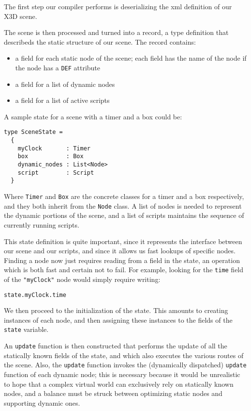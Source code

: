 
The first step our compiler performs is deserializing the xml definition of our X3D scene.

The scene is then processed and turned into a record, a type definition that describeds the static structure of our scene. The record contains:

\begin{itemize}
\item a field for each static node of the scene; each field has the name of the node if the node has a \texttt{DEF} attribute
\item a field for a list of dynamic nodes
\item a field for a list of active scripts
\end{itemize}

A sample state for a scene with a timer and a box could be:

\begin{lstlisting}
type SceneState =
  {
    myClock       : Timer 
    box           : Box
    dynamic_nodes : List<Node>
    script        : Script
  }
\end{lstlisting}

Where \texttt{Timer} and \texttt{Box} are the concrete classes for a timer and a box respectively, and they both inherit from the \texttt{Node} class.
A list of nodes is needed to represent the dynamic portions of the scene, and a list of scripts maintains the sequence of currently running scripts.

This state definition is quite important, since it represents the interface between our scene and our scripts, and since it allows us fast lookups of specific nodes. Finding a node now just requires reading from a field in the state, an operation which is both fast and certain not to fail. For example, looking for the \texttt{time} field of the \texttt{"myClock"} node would simply require writing:

\begin{lstlisting}
state.myClock.time
\end{lstlisting}

We then proceed to the initialization of the state. This amounts to creating instances of each node, and then assigning these instances to the fields of the \texttt{state} variable.

An \texttt{update} function is then constructed that performs the update of all the statically known fields of the state, and which also executes the various routes of the scene. Also, the \texttt{update} function invokes the (dynamically dispatched) \texttt{update} function of each dynamic node; this is necessary because it would be unrealistic to hope that a complex virtual world can exclusively rely on statically known nodes, and a balance must be struck between optimizing static nodes and supporting dynamic ones.

